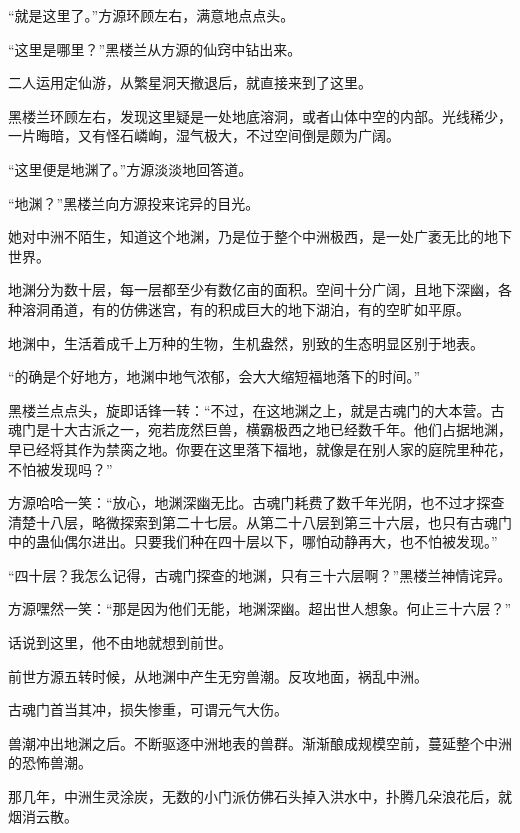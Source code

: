 
\begin{this_body}



“就是这里了。”方源环顾左右，满意地点点头。

“这里是哪里？”黑楼兰从方源的仙窍中钻出来。

二人运用定仙游，从繁星洞天撤退后，就直接来到了这里。

黑楼兰环顾左右，发现这里疑是一处地底溶洞，或者山体中空的内部。光线稀少，一片晦暗，又有怪石嶙峋，湿气极大，不过空间倒是颇为广阔。

“这里便是地渊了。”方源淡淡地回答道。

“地渊？”黑楼兰向方源投来诧异的目光。

她对中洲不陌生，知道这个地渊，乃是位于整个中洲极西，是一处广袤无比的地下世界。

地渊分为数十层，每一层都至少有数亿亩的面积。空间十分广阔，且地下深幽，各种溶洞甬道，有的仿佛迷宫，有的积成巨大的地下湖泊，有的空旷如平原。

地渊中，生活着成千上万种的生物，生机盎然，别致的生态明显区别于地表。

“的确是个好地方，地渊中地气浓郁，会大大缩短福地落下的时间。”

黑楼兰点点头，旋即话锋一转：“不过，在这地渊之上，就是古魂门的大本营。古魂门是十大古派之一，宛若庞然巨兽，横霸极西之地已经数千年。他们占据地渊，早已经将其作为禁脔之地。你要在这里落下福地，就像是在别人家的庭院里种花，不怕被发现吗？”

方源哈哈一笑：“放心，地渊深幽无比。古魂门耗费了数千年光阴，也不过才探查清楚十八层，略微探索到第二十七层。从第二十八层到第三十六层，也只有古魂门中的蛊仙偶尔进出。只要我们种在四十层以下，哪怕动静再大，也不怕被发现。”

“四十层？我怎么记得，古魂门探查的地渊，只有三十六层啊？”黑楼兰神情诧异。

方源嘿然一笑：“那是因为他们无能，地渊深幽。超出世人想象。何止三十六层？”

话说到这里，他不由地就想到前世。

前世方源五转时候，从地渊中产生无穷兽潮。反攻地面，祸乱中洲。

古魂门首当其冲，损失惨重，可谓元气大伤。

兽潮冲出地渊之后。不断驱逐中洲地表的兽群。渐渐酿成规模空前，蔓延整个中洲的恐怖兽潮。

那几年，中洲生灵涂炭，无数的小门派仿佛石头掉入洪水中，扑腾几朵浪花后，就烟消云散。


\end{this_body}

